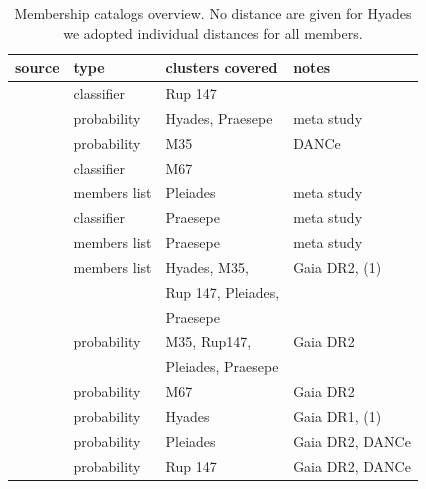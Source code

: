 \documentclass{aa}
\begin{document}
\begin{appendix}

\begin{table}
\caption{Membership catalogs overview. No distance are given for Hyades we adopted individual distances for all members. }
\label{table_app_memberships}
\centering
\begin{tabular}{llll}     %
\hline\hline
     source  & type  & clusters covered & notes\\
\hline
   \citet{curtis_ruprecht_2013} & classifier & Rup 147 & \\
   \citet{douglas_praesepe_hyades_2014} & probability & Hyades, Praesepe & meta study \\
   \citet{bouy_messier_2015} & probability & M35 & DANCe\\
   \citet{gonzalez_m67mem_2016} & classifier & M67 & \\
   \citet{rebull_rotation_2016} & members list & Pleiades & meta study\\
   \citet{rebull_praesepe_2017} & classifier & Praesepe & meta study\\
   \citet{douglas_poking_2017} & members list & Praesepe & meta study\\
   \citet{gaia_dr2_2018_hrd} & members list & Hyades, M35,  & Gaia DR2, (1)\\
   &&Rup 147, Pleiades, &\\
   &&Praesepe&\\
   \citet{cantat_gaudin_2018} & probability & M35, Rup147, & Gaia DR2\\
   && Pleiades, Praesepe&\\
   \citet{gao_m67mem_2018} & probability & M67 & Gaia DR2\\
   \citet{reino_hyades_2018} & probability & Hyades & Gaia DR1, (1)\\
   \citet{olivares_pleiades_2018} & probability & Pleiades & Gaia DR2, DANCe\\
   \citet{olivares_ngc6774_2019} & probability & Rup 147 & Gaia DR2, DANCe\\
\hline
\end{tabular}
\end{table}



\end{appendix}
\end{document}
